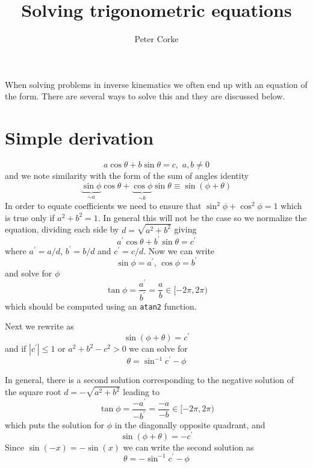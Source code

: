 \documentclass[11pt,a4paper,fleqn]{article}
\title{Solving trigonometric equations}
\author{Peter Corke}
\begin{document}
\maketitle
When solving problems in inverse kinematics we often end up with an equation of the form.  There are several ways to solve this and they
are discussed below.

\section*{Simple derivation}
\begin{equation}
a \cos \theta + b \sin \theta = c, \,\, a,b \ne 0 \label{eq:problem-orig}
\end{equation}
and we note similarity with the form of the sum of angles identity
\[
 \underbrace{\sin \phi}_{\sim a} \cos \theta + \underbrace{\cos \phi}_{\sim b} \sin \theta \equiv \sin (\phi + \theta) 
\]
In order to equate coefficients we need to ensure that $\sin^2 \phi + \cos^2 \phi = 1$ which is true only if $a^2 + b^2 = 1$. 
In general this will not be the case so we normalize the equation, dividing each side by $d = \sqrt{a^2 + b^2}$ giving
\begin{equation}
a^\prime \cos \theta + b^\prime \sin \theta = c^\prime \label{eq:problem}
\end{equation}
where $a^\prime= a/d$, $b^\prime=b/d$ and $c^\prime=c/d$.
Now we can write
\[
\sin \phi = a^\prime, \, \cos \phi = b^\prime
\]
and solve for $\phi$
\[
\tan \phi = \frac{a^\prime}{b^\prime}  = \frac{a}{b} \in [-2\pi, 2\pi)
\]
which should be computed using an \texttt{atan2} function. 

Next we  rewrite  as
\[
\sin (\phi + \theta) = c^\prime
\]
and if $|c^\prime| \le 1$ or $a^2+b^2-c^2 > 0$ we can solve  for
\[
\theta = \sin^{-1} c^\prime - \phi
\]

In general, there is a second solution corresponding to the negative solution of the square root $d = -\sqrt{a^2 + b^2}$ leading to
\[
\tan \phi = \frac{-a^\prime}{-b^\prime}  = \frac{-a}{-b} \in [-2\pi, 2\pi)
\]
which puts the solution for $\phi$ in the diagonally opposite quadrant, and
\[
\sin (\phi + \theta) = -c^\prime
\]
Since $\sin( -x) = -\sin(x)$ we can write the second solution as
\[
\theta = -\sin^{-1} c^\prime - \phi
\]
\end{document}
